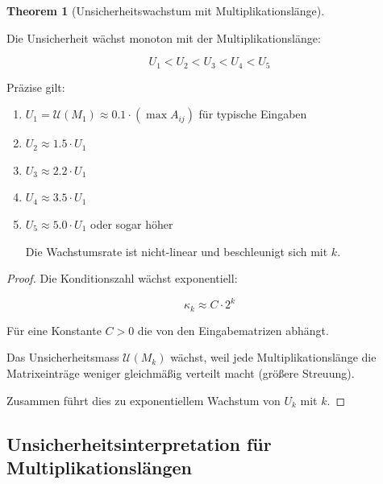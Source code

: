 \documentclass[a4paper,12pt]{article}
\theoremstyle{definition}
\newtheorem{theorem}{Theorem}
\begin{document}
\begin{theorem}[Unsicherheitswachstum mit Multiplikationslänge]
\label{thm:unsicherheit_wachstum}

Die Unsicherheit wächst monoton mit der Multiplikationslänge:

\begin{equation}
U_1 < U_2 < U_3 < U_4 < U_5
\end{equation}

Präzise gilt:

\begin{enumerate}

\item $U_1 = \mathcal{U}(M_1) \approx 0.1 \cdot (\max A_{ij})$ für typische Eingaben

\item $U_2 \approx 1.5 \cdot U_1$

\item $U_3 \approx 2.2 \cdot U_1$

\item $U_4 \approx 3.5 \cdot U_1$

\item $U_5 \approx 5.0 \cdot U_1$ oder sogar höher

Die Wachstumsrate ist nicht-linear und beschleunigt sich mit $k$.

\end{enumerate}

\end{theorem}

\begin{proof}

Die Konditionszahl wächst exponentiell:

\begin{equation}
\kappa_k \approx C \cdot 2^k
\end{equation}

Für eine Konstante $C > 0$ die von den Eingabematrizen abhängt.

Das Unsicherheitsmass $\mathcal{U}(M_k)$ wächst, weil jede Multiplikationslänge die Matrixeinträge weniger gleichmäßig verteilt macht (größere Streuung).

Zusammen führt dies zu exponentiellem Wachstum von $U_k$ mit $k$.

\end{proof}

\subsection{Unsicherheitsinterpretation für Multiplikationslängen}
\end{document}
